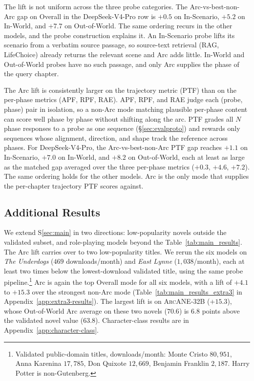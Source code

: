 \documentclass[11pt]{article}
\newcommand{\ours}{\textsc{ArcANE}}
\begin{document}
The lift is not uniform across the three probe categories. The Arc-vs-best-non-Arc gap on Overall in the DeepSeek-V4-Pro row is $+0.5$ on In-Scenario, $+5.2$ on In-World, and $+7.7$ on Out-of-World. The same ordering recurs in the other models, and the probe construction explains it. An In-Scenario probe lifts its scenario from a verbatim source passage, so source-text retrieval (RAG, LifeChoice) already returns the relevant scene and Arc adds little. In-World and Out-of-World probes have no such passage, and only Arc supplies the phase of the query chapter.

The Arc lift is consistently larger on the trajectory metric (PTF) than on the per-phase metrics (APF, RPF, RAE). APF, RPF, and RAE judge each (probe, phase) pair in isolation, so a non-Arc mode matching plausible per-phase content can score well phase by phase without shifting along the arc. PTF grades all $N$ phase responses to a probe as one sequence (\S\ref{sec:evalproto}) and rewards only sequences whose alignment, direction, and shape track the reference across phases. For DeepSeek-V4-Pro, the Arc-vs-best-non-Arc PTF gap reaches $+1.1$ on In-Scenario, $+7.0$ on In-World, and $+8.2$ on Out-of-World, each at least as large as the matched gap averaged over the three per-phase metrics ($+0.3$, $+4.6$, $+7.2$). The same ordering holds for the other models. Arc is the only mode that supplies the per-chapter trajectory PTF scores against.


\subsection{Additional Results\label{sec:additional}}

We extend S\ref{sec:main} in two directions: low-popularity novels outside the validated subset, and role-playing models beyond the Table~\ref{tab:main_results}. The Arc lift carries over to two low-popularity titles. We rerun the six models on \emph{The Underdogs} ($469$ downloads/month) and \emph{East Lynne} ($1{,}038$/month), each at least two times below the lowest-download validated title, using the same probe pipeline.\footnote{Validated public-domain titles, downloads/month: Monte Cristo $80{,}951$, Anna Karenina $17{,}785$, Don Quixote $12{,}669$, Benjamin Franklin $2{,}187$. Harry Potter is non-Gutenberg.} Arc is again the top Overall mode for all six models, with a lift of $+4.1$ to $+15.3$ over the strongest non-Arc mode (Table~\ref{tab:main_results_extra3} in Appendix~\ref{app:extra3-results}). The largest lift is on \ours{}-32B ($+15.3$), whose Out-of-World Arc average on these two novels ($70.6$) is $6.8$ points above the validated novel value ($63.8$). Character-class results are in Appendix~\ref{app:character-class}.
\end{document}

